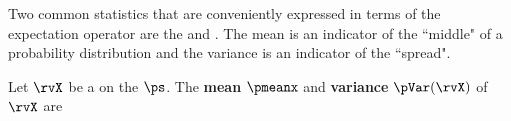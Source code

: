 Two common statistics that are conveniently expressed in terms of the
expectation operator are the  and .
The mean is an indicator of the ``middle" of a probability distribution and the
variance is an indicator of the ``spread".
\begin{definition}
\label{def:Mx}
\label{def:pvar}
\label{def:pVar}
Let $\rvX$ be a  on the  $\ps$.
The {\bf mean} $\pmeanx$ and {\bf variance} $\pVar(\rvX)$ of $\rvX$ are
\end{definition}

